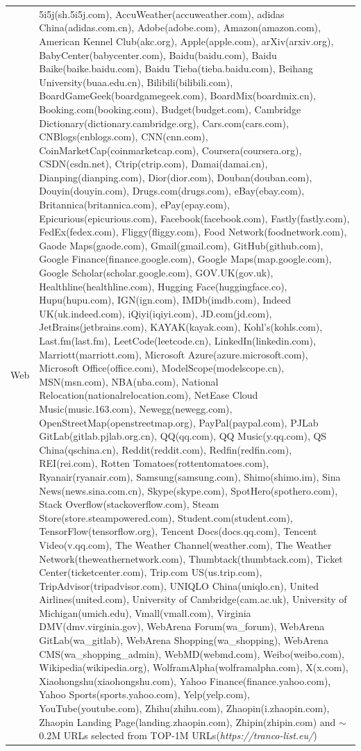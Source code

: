 \begin{center}
{\begin{minipage}{\textwidth}
\begin{tabularx}{\textwidth}{l|X}
    \\
    \hline
    Web & 5i5j(sh.5i5j.com), AccuWeather(accuweather.com), adidas China(adidas.com.cn), Adobe(adobe.com), Amazon(amazon.com), American Kennel Club(akc.org), Apple(apple.com), arXiv(arxiv.org), BabyCenter(babycenter.com), Baidu(baidu.com), Baidu Baike(baike.baidu.com), Baidu Tieba(tieba.baidu.com), Beihang University(buaa.edu.cn), Bilibili(bilibili.com), BoardGameGeek(boardgamegeek.com), BoardMix(boardmix.cn), Booking.com(booking.com), Budget(budget.com), Cambridge Dictionary(dictionary.cambridge.org), Cars.com(cars.com), CNBlogs(cnblogs.com), CNN(cnn.com), CoinMarketCap(coinmarketcap.com), Coursera(coursera.org), CSDN(csdn.net), Ctrip(ctrip.com), Damai(damai.cn), Dianping(dianping.com), Dior(dior.com), Douban(douban.com), Douyin(douyin.com), Drugs.com(drugs.com), eBay(ebay.com), Britannica(britannica.com), ePay(epay.com), Epicurious(epicurious.com), Facebook(facebook.com), Fastly(fastly.com), FedEx(fedex.com), Fliggy(fliggy.com), Food Network(foodnetwork.com), Gaode Maps(gaode.com), Gmail(gmail.com), GitHub(github.com), Google Finance(finance.google.com), Google Maps(map.google.com), Google Scholar(scholar.google.com), GOV.UK(gov.uk), Healthline(healthline.com), Hugging Face(huggingface.co), Hupu(hupu.com), IGN(ign.com), IMDb(imdb.com), Indeed UK(uk.indeed.com), iQiyi(iqiyi.com), JD.com(jd.com), JetBrains(jetbrains.com), KAYAK(kayak.com), Kohl's(kohls.com), Last.fm(last.fm), LeetCode(leetcode.cn), LinkedIn(linkedin.com), Marriott(marriott.com), Microsoft Azure(azure.microsoft.com), Microsoft Office(office.com), ModelScope(modelscope.cn), MSN(msn.com), NBA(nba.com), National Relocation(nationalrelocation.com), NetEase Cloud Music(music.163.com), Newegg(newegg.com), OpenStreetMap(openstreetmap.org), PayPal(paypal.com), PJLab GitLab(gitlab.pjlab.org.cn), QQ(qq.com), QQ Music(y.qq.com), QS China(qschina.cn), Reddit(reddit.com), Redfin(redfin.com), REI(rei.com), Rotten Tomatoes(rottentomatoes.com), Ryanair(ryanair.com), Samsung(samsung.com), Shimo(shimo.im), Sina News(news.sina.com.cn), Skype(skype.com), SpotHero(spothero.com), Stack Overflow(stackoverflow.com), Steam Store(store.steampowered.com), Student.com(student.com), TensorFlow(tensorflow.org), Tencent Docs(docs.qq.com), Tencent Video(v.qq.com), The Weather Channel(weather.com), The Weather Network(theweathernetwork.com), Thumbtack(thumbtack.com), Ticket Center(ticketcenter.com), Trip.com US(us.trip.com), TripAdvisor(tripadvisor.com), UNIQLO China(uniqlo.cn), United Airlines(united.com), University of Cambridge(cam.ac.uk), University of Michigan(umich.edu), Vmall(vmall.com), Virginia DMV(dmv.virginia.gov), WebArena Forum(wa\_forum), WebArena GitLab(wa\_gitlab), WebArena Shopping(wa\_shopping), WebArena CMS(wa\_shopping\_admin), WebMD(webmd.com), Weibo(weibo.com), Wikipedia(wikipedia.org), WolframAlpha(wolframalpha.com), X(x.com), Xiaohongshu(xiaohongshu.com), Yahoo Finance(finance.yahoo.com), Yahoo Sports(sports.yahoo.com), Yelp(yelp.com), YouTube(youtube.com), Zhihu(zhihu.com), Zhaopin(i.zhaopin.com), Zhaopin Landing Page(landing.zhaopin.com), Zhipin(zhipin.com) and  $\sim$ 0.2M URLs selected from TOP-1M URLs(\textit{https://tranco-list.eu/})  \\

\end{tabularx}
\end{minipage}}
\end{center}
